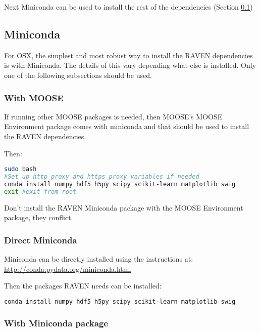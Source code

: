 Next Miniconda can be used to install the rest of the dependencies
(Section \ref{miniconda})


\subsection{Miniconda}
\label{miniconda}

For OSX, the simplest and most robust way to install the RAVEN dependencies
is with Miniconda.  The details of this vary depending what else is
installed.  Only one of the following subsections should be used.

\subsubsection{With MOOSE}
\label{miniconda_moose}

If running other MOOSE packages is needed, then MOOSE's MOOSE
Environment package comes with miniconda and that should be used to
install the RAVEN dependencies.

Then:
\begin{lstlisting}[language=bash]
sudo bash
#Set up http_proxy and https_proxy variables if needed
conda install numpy hdf5 h5py scipy scikit-learn matplotlib swig
exit #exit from root
\end{lstlisting}

Don't install the RAVEN Miniconda package with the MOOSE Environment
package, they conflict.

\goToRavenInstallation

\subsubsection{Direct Miniconda}

Miniconda can be directly installed using the instructions at: \url{http://conda.pydata.org/miniconda.html}

Then the packages RAVEN needs can be installed:
\begin{lstlisting}[language=bash]
conda install numpy hdf5 h5py scipy scikit-learn matplotlib swig
\end{lstlisting}

\goToRavenInstallation

\subsubsection{With Miniconda package}

